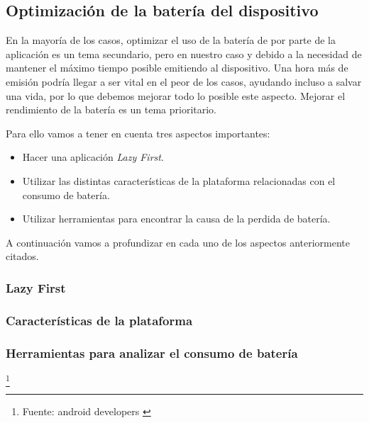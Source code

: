 \subsection{Optimización de la batería del dispositivo}

En la mayoría de los casos, optimizar el uso de la batería de por parte de la aplicación es un tema secundario, pero en nuestro caso y debido a la necesidad de mantener el máximo tiempo posible emitiendo al dispositivo. Una hora más de emisión podría llegar a ser vital en el peor de los casos, ayudando incluso a salvar una vida, por lo que debemos mejorar todo lo posible este aspecto. Mejorar el rendimiento de la batería es un tema prioritario.


Para ello vamos a tener en cuenta tres aspectos importantes:
\begin{itemize}
\item Hacer una aplicación \textit{Lazy First}.
\item Utilizar las distintas características de la plataforma relacionadas con el consumo de batería.
\item Utilizar herramientas para encontrar la causa de la perdida de batería.
\end{itemize}

A continuación vamos a profundizar en cada uno de los aspectos anteriormente citados.
\subsubsection{Lazy First}

\subsubsection{Características de la plataforma}

\subsubsection{Herramientas para analizar el consumo de batería}

\footnote{Fuente: android developers \cite{OPTIMIZABATERIA}}
